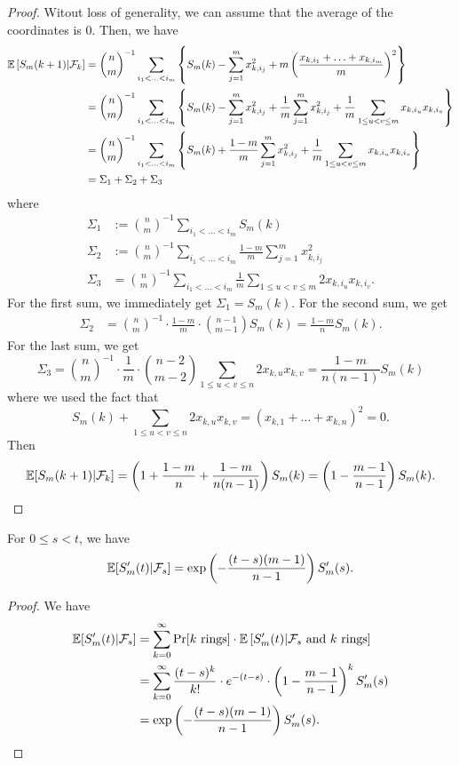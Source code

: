 \documentclass[12pt]{article}
\begin{document}
\begin{proof}
	Witout loss of generality, we can assume that the average of the coordinates is $0$. Then, we have 
	\begin{align*}
		\mathbb{E} \left [ S_m(k+1) | \mathcal{F}_k \right ] & = \binom{n}{m}^{-1} \sum_{i_1 < \ldots < i_m} \left \{ S_m(k) - \sum_{j = 1}^m x_{k, i_j}^2 + m \left ( \frac{x_{k, i_1} + \ldots + x_{k, i_m}}{m} \right )^2 \right \} \\
		& = \binom{n}{m}^{-1} \sum_{i_1 < \ldots < i_m} \left \{ S_m(k) - \sum_{j = 1}^m x_{k, i_j}^2  + \frac{1}{m} \sum_{j = 1}^m x_{k, i_j}^2 + \frac{1}{m} \sum_{1 \leq u < v \leq m} x_{k, i_u} x_{k, i_v} \right \} \\
		& = \binom{n}{m}^{-1} \sum_{i_1 < \ldots < i_m} \left \{ S_m(k) + \frac{1-m}{m} \sum_{j = 1}^m x_{k, i_j}^2 + \frac{1}{m} \sum_{1 \leq u < v \leq m} x_{k, i_u} x_{k, i_v} \right \} \\
		& = \Sigma_1 + \Sigma_2 + \Sigma_3
	\end{align*}
	where 
	\begin{align*}
		\Sigma_1 & := \binom{n}{m}^{-1} \sum_{i_1 < \ldots < i_m} S_m(k) \\
		\Sigma_2 & := \binom{n}{m}^{-1} \sum_{i_1 < \ldots < i_m} \frac{1-m}{m} \sum_{j = 1}^m x_{k, i_j}^2 \\
		\Sigma_3 & = \binom{n}{m}^{-1} \sum_{i_1 < \ldots < i_m} \frac{1}{m} \sum_{1 \leq u < v \leq m} 2x_{k, i_u} x_{k, i_v}.
	\end{align*}
	For the first sum, we immediately get $\Sigma_1 = S_m(k)$. For the second sum, we get 
	\begin{align*}
		\Sigma_2 & = \binom{n}{m}^{-1} \cdot \frac{1-m}{m} \cdot \binom{n-1}{m-1} S_m(k) = \frac{1-m}{n} S_m(k). 
	\end{align*}
	For the last sum, we get 
	\[
		\Sigma_3 = \binom{n}{m}^{-1} \cdot \frac{1}{m} \cdot \binom{n-2}{m-2} \sum_{1 \leq u < v \leq n} 2x_{k, u} x_{k, v} = \frac{1-m}{n(n-1)} S_m(k)
	\]
	where we used the fact that 
	\[
		S_m(k) + \sum_{1 \leq u < v \leq n} 2x_{k, u} x_{k, v} = (x_{k, 1} + \ldots + x_{k, n})^2 = 0.	
	\]
	Then 
	\[
		\mathbb{E} [S_m(k+1) | \mathcal{F}_k] = \left ( 1 + \frac{1-m}{n} + \frac{1-m}{n(n-1)} \right ) S_m(k) = \left ( 1 - \frac{m-1}{n-1} \right ) S_m(k).	
	\]
\end{proof}

\begin{cor} \label{explicit-formula-2}
	For $0 \leq s < t$, we have 
	\[
		\mathbb{E} [S_m'(t) | \mathcal{F}_s] = \exp \left ( -\frac{(t-s)(m-1)}{n-1} \right ) S_m'(s).	
	\]
\end{cor}
\begin{proof}
	We have 
	\begin{align*}
		\mathbb{E} [ S_m'(t) | \mathcal{F}_s ] & = \sum_{k = 0}^\infty \Pr[k \text{ rings}] \cdot \mathbb{E} \left [ S_m'(t) | \mathcal{F}_s \text{ and } k \text{ rings} \right ] \\
		& = \sum_{k = 0}^\infty \frac{(t-s)^k}{k!} \cdot e^{-(t-s)} \cdot \left ( 1 - \frac{m-1}{n-1} \right )^k S_m'(s) \\
		& = \exp \left ( -\frac{(t-s)(m-1)}{n-1} \right ) S_m'(s). 
	\end{align*}
\end{proof}
\end{document}
